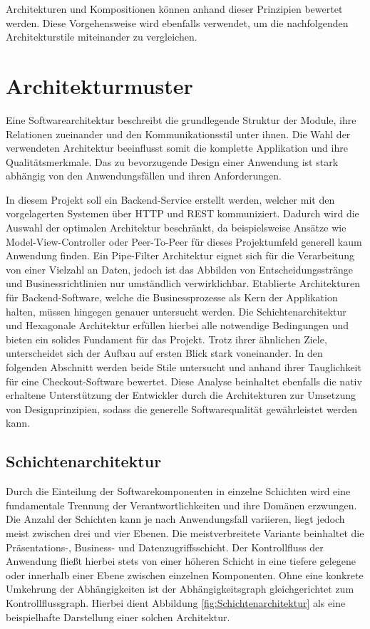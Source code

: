 Architekturen und Kompositionen können anhand dieser Prinzipien bewertet werden. Diese Vorgehensweise wird ebenfalls verwendet, um die nachfolgenden Architekturstile miteinander zu vergleichen. 

\section{Architekturmuster}

Eine Softwarearchitektur beschreibt die grundlegende Struktur der Module, ihre Relationen zueinander und den Kommunikationsstil unter ihnen. Die Wahl der verwendeten Architektur beeinflusst somit die komplette Applikation und ihre Qualitätsmerkmale. Das zu bevorzugende Design einer Anwendung ist stark abhängig von den Anwendungsfällen und ihren Anforderungen. 

In diesem Projekt soll ein Backend-Service erstellt werden, welcher mit den vorgelagerten Systemen über \acrshort{HTTP} und \acrshort{REST} kommuniziert. Dadurch wird die Auswahl der optimalen Architektur beschränkt, da beispielsweise Ansätze wie Model-View-Controller oder Peer-To-Peer für dieses Projektumfeld generell kaum Anwendung finden. Ein Pipe-Filter Architektur eignet sich für die Verarbeitung von einer Vielzahl an Daten, jedoch ist das Abbilden von Entscheidungsstränge und Businessrichtlinien nur umständlich verwirklichbar. Etablierte Architekturen für Backend-Software, welche die Businessprozesse als Kern der Applikation halten, müssen hingegen genauer untersucht werden. Die Schichtenarchitektur und Hexagonale Architektur erfüllen hierbei alle notwendige Bedingungen und bieten ein solides Fundament für das Projekt. Trotz ihrer ähnlichen Ziele, unterscheidet sich der Aufbau auf ersten Blick stark voneinander. In den folgenden Abschnitt werden beide Stile untersucht und anhand ihrer Tauglichkeit für eine Checkout-Software bewertet. Diese Analyse beinhaltet ebenfalls die nativ erhaltene Unterstützung der Entwickler durch die Architekturen zur Umsetzung von Designprinzipien, sodass die generelle Softwarequalität gewährleistet werden kann. 

\subsection{Schichtenarchitektur}

Durch die Einteilung der Softwarekomponenten in einzelne Schichten wird eine fundamentale Trennung der Verantwortlichkeiten und ihre Domänen erzwungen. Die Anzahl der Schichten kann je nach Anwendungsfall variieren, liegt jedoch meist zwischen drei und vier Ebenen. Die meistverbreitete Variante beinhaltet die Präsentations-, Business- und Datenzugriffsschicht. Der Kontrollfluss der Anwendung fließt hierbei stets von einer höheren Schicht in eine tiefere gelegene oder innerhalb einer Ebene zwischen einzelnen Komponenten. Ohne eine konkrete Umkehrung der Abhängigkeiten ist der Abhängigkeitsgraph gleichgerichtet zum Kontrollflussgraph. Hierbei dient Abbildung \ref{fig:Schichtenarchitektur} als eine beispielhafte Darstellung einer solchen Architektur. 

